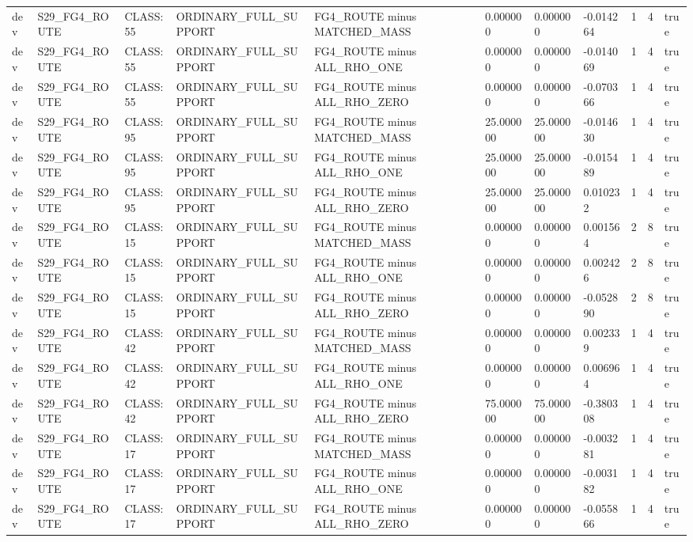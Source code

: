 \begin{tabular}{lllllllllll}
dev & S29\_FG4\_ROUTE & CLASS:55 & ORDINARY\_FULL\_SUPPORT & FG4\_ROUTE minus MATCHED\_MASS & 0.000000 & 0.000000 & -0.014264 & 1 & 4 & true \\
dev & S29\_FG4\_ROUTE & CLASS:55 & ORDINARY\_FULL\_SUPPORT & FG4\_ROUTE minus ALL\_RHO\_ONE & 0.000000 & 0.000000 & -0.014069 & 1 & 4 & true \\
dev & S29\_FG4\_ROUTE & CLASS:55 & ORDINARY\_FULL\_SUPPORT & FG4\_ROUTE minus ALL\_RHO\_ZERO & 0.000000 & 0.000000 & -0.070366 & 1 & 4 & true \\
dev & S29\_FG4\_ROUTE & CLASS:95 & ORDINARY\_FULL\_SUPPORT & FG4\_ROUTE minus MATCHED\_MASS & 25.000000 & 25.000000 & -0.014630 & 1 & 4 & true \\
dev & S29\_FG4\_ROUTE & CLASS:95 & ORDINARY\_FULL\_SUPPORT & FG4\_ROUTE minus ALL\_RHO\_ONE & 25.000000 & 25.000000 & -0.015489 & 1 & 4 & true \\
dev & S29\_FG4\_ROUTE & CLASS:95 & ORDINARY\_FULL\_SUPPORT & FG4\_ROUTE minus ALL\_RHO\_ZERO & 25.000000 & 25.000000 & 0.010232 & 1 & 4 & true \\
dev & S29\_FG4\_ROUTE & CLASS:15 & ORDINARY\_FULL\_SUPPORT & FG4\_ROUTE minus MATCHED\_MASS & 0.000000 & 0.000000 & 0.001564 & 2 & 8 & true \\
dev & S29\_FG4\_ROUTE & CLASS:15 & ORDINARY\_FULL\_SUPPORT & FG4\_ROUTE minus ALL\_RHO\_ONE & 0.000000 & 0.000000 & 0.002426 & 2 & 8 & true \\
dev & S29\_FG4\_ROUTE & CLASS:15 & ORDINARY\_FULL\_SUPPORT & FG4\_ROUTE minus ALL\_RHO\_ZERO & 0.000000 & 0.000000 & -0.052890 & 2 & 8 & true \\
dev & S29\_FG4\_ROUTE & CLASS:42 & ORDINARY\_FULL\_SUPPORT & FG4\_ROUTE minus MATCHED\_MASS & 0.000000 & 0.000000 & 0.002339 & 1 & 4 & true \\
dev & S29\_FG4\_ROUTE & CLASS:42 & ORDINARY\_FULL\_SUPPORT & FG4\_ROUTE minus ALL\_RHO\_ONE & 0.000000 & 0.000000 & 0.006964 & 1 & 4 & true \\
dev & S29\_FG4\_ROUTE & CLASS:42 & ORDINARY\_FULL\_SUPPORT & FG4\_ROUTE minus ALL\_RHO\_ZERO & 75.000000 & 75.000000 & -0.380308 & 1 & 4 & true \\
dev & S29\_FG4\_ROUTE & CLASS:17 & ORDINARY\_FULL\_SUPPORT & FG4\_ROUTE minus MATCHED\_MASS & 0.000000 & 0.000000 & -0.003281 & 1 & 4 & true \\
dev & S29\_FG4\_ROUTE & CLASS:17 & ORDINARY\_FULL\_SUPPORT & FG4\_ROUTE minus ALL\_RHO\_ONE & 0.000000 & 0.000000 & -0.003182 & 1 & 4 & true \\
dev & S29\_FG4\_ROUTE & CLASS:17 & ORDINARY\_FULL\_SUPPORT & FG4\_ROUTE minus ALL\_RHO\_ZERO & 0.000000 & 0.000000 & -0.055866 & 1 & 4 & true \\

\end{tabular}

